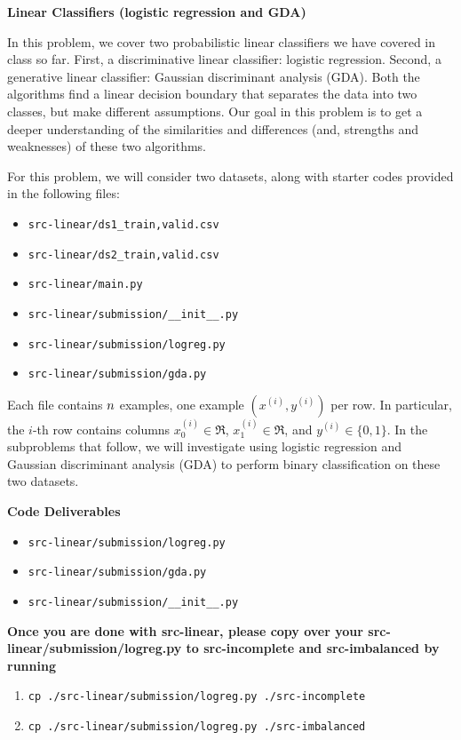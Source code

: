 \item {\bf Linear Classifiers (logistic regression and GDA)}

In this problem, we cover two probabilistic linear classifiers we have covered in class so far. First, a discriminative linear classifier: logistic regression. Second, a generative linear classifier: Gaussian discriminant analysis (GDA). Both the algorithms find a linear decision boundary that separates the data into two classes, but make different assumptions. Our goal in this problem is to get a deeper understanding of the similarities and differences (and, strengths and weaknesses) of these two algorithms.

For this problem, we will consider two datasets, along with starter codes provided in the following files:
\begin{center}
\begin{itemize}
	\item \texttt{src-linear/ds1\_{train,valid}.csv}
	\item \texttt{src-linear/ds2\_{train,valid}.csv}
  	\item \texttt{src-linear/main.py}
	  \item \texttt{src-linear/submission/\_\_init\_\_.py}
	\item \texttt{src-linear/submission/logreg.py}
	\item \texttt{src-linear/submission/gda.py}
\end{itemize}
\end{center}
Each file contains ${n}$ examples, one example $(x^{(i)}, y^{(i)})$ per row. In particular, the $i$-th row contains columns $x^{(i)}_0\in\Re$, $x^{(i)}_1\in\Re$, and $y^{(i)}\in\{0, 1\}$. In the subproblems that follow, we will investigate using logistic regression and Gaussian discriminant analysis (GDA) to perform binary classification on these two datasets.

\textbf{Code Deliverables}
\begin{itemize}
	\item \texttt{src-linear/submission/logreg.py}
	\item \texttt{src-linear/submission/gda.py}
	\item \texttt{src-linear/submission/\_\_init\_\_.py}
\end{itemize}

\begin{enumerate}
	
	
	
	
	
	
	
	
\end{enumerate}

\textbf{Once you are done with src-linear, please copy over your src-linear/submission/logreg.py to src-incomplete and src-imbalanced by running}
\begin{enumerate}
	\item \texttt{cp ./src-linear/submission/logreg.py ./src-incomplete}
	\item \texttt{cp ./src-linear/submission/logreg.py ./src-imbalanced}
\end{enumerate}
